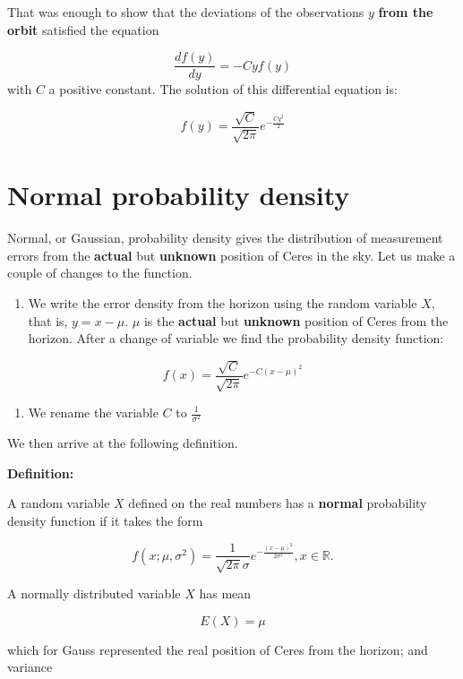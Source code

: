 \documentclass[
]{book}
\providecommand{\tightlist}{%
  \setlength{\itemsep}{0pt}\setlength{\parskip}{0pt}}
\begin{document}
That was enough to show that the deviations of the observations \(y\) \textbf{from the orbit} satisfied the equation \citep{Stahl2006}

\[\frac{df(y)}{dy}=-Cyf(y)\]
with \(C\) a positive constant. The solution of this differential equation is:

\[f(y)=\frac{\sqrt{C}}{\sqrt{2\pi}}e^{-\frac{Cy^2}{2}}\]

\hypertarget{normal-probability-density}{%
\section{Normal probability density}\label{normal-probability-density}}

Normal, or Gaussian, probability density gives the distribution of measurement errors from the \textbf{actual} but \textbf{unknown} position of Ceres in the sky. Let us make a couple of changes to the function.

\begin{enumerate}
\def\labelenumi{\arabic{enumi})}
\tightlist
\item
  We write the error density from the horizon using the random variable \(X\), that is, \(y=x-\mu\). \(\mu\) is the \textbf{actual} but \textbf{unknown} position of Ceres from the horizon. After a change of variable we find the probability density function:
\end{enumerate}

\[f(x)=\frac{\sqrt{C}}{\sqrt{2\pi}}e^{-C(x-\mu)^2}\]

\begin{enumerate}
\def\labelenumi{\arabic{enumi})}
\setcounter{enumi}{1}
\tightlist
\item
  We rename the variable \(C\) to \(\frac{1}{\sigma^2}\)
\end{enumerate}

We then arrive at the following definition.

\textbf{Definition:}

A random variable \(X\) defined on the real numbers has a \textbf{normal} probability density function if it takes the form

\[f(x; \mu, \sigma^2)=\frac{1}{\sqrt{2\pi}\sigma}e^{-\frac{(x-\mu)^2}{2\sigma^2}}, x \in {\mathbb R}.\]

A normally distributed variable \(X\) has mean

\[E(X) = \mu\]

which for Gauss represented the real position of Ceres from the horizon; and variance
\end{document}
